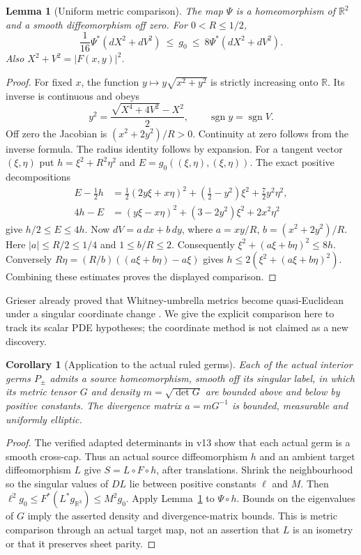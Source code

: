 \documentclass[11pt]{article}
\newtheorem{lemma}[theorem]{Lemma}
\newtheorem{corollary}[theorem]{Corollary}
\theoremstyle{remark}\newtheorem{remark}[theorem]{Remark}
\newcommand{\R}{\mathbb R}\newcommand{\C}{\mathbb C}
\begin{document}
\begin{lemma}[Uniform metric comparison]\label{lem:metric}
The map $\Psi$ is a homeomorphism of $\R^2$ and a smooth diffeomorphism
off zero. For $0<R\leq1/2$,
\[
 \frac1{16}\Psi^*(dX^2+dV^2)\ \leq\ g_0\ \leq\
 8\Psi^*(dX^2+dV^2).
\]
Also $X^2+V^2=|F(x,y)|^2$.
\end{lemma}
\begin{proof}
For fixed $x$, the function $y\mapsto y\sqrt{x^2+y^2}$ is strictly
increasing onto $\R$. Its inverse is continuous and obeys
\[
 y^2=\frac{\sqrt{X^4+4V^2}-X^2}{2},\qquad \operatorname{sgn}y=\operatorname{sgn}V.
\]
Off zero the Jacobian is $(x^2+2y^2)/R>0$. Continuity at zero follows
from the inverse formula. The radius identity follows by expansion.
For a tangent vector $(\xi,\eta)$ put $h=\xi^2+R^2\eta^2$ and
$E=g_0((\xi,\eta),(\xi,\eta))$. The exact positive decompositions
\begin{align*}
 E-\tfrac12h&=\tfrac12(2y\xi+x\eta)^2
       +(\tfrac12-y^2)\xi^2+\tfrac72y^2\eta^2,\\
 4h-E&=(y\xi-x\eta)^2+(3-2y^2)\xi^2+2x^2\eta^2
\end{align*}
give $h/2\leq E\leq4h$.
Now $dV=a\,dx+b\,dy$, where $a=xy/R$, $b=(x^2+2y^2)/R$.
Here $|a|\leq R/2\leq1/4$ and $1\leq b/R\leq2$.
Consequently $\xi^2+(a\xi+b\eta)^2\leq8h$.
Conversely $R\eta=(R/b)((a\xi+b\eta)-a\xi)$ gives
$h\leq2(\xi^2+(a\xi+b\eta)^2)$. Combining these estimates proves
the displayed comparison.
\end{proof}

Grieser already proved that Whitney-umbrella metrics become quasi-Euclidean
under a singular coordinate change \cite[Section 1]{grieser}. We give the
explicit comparison here to track its scalar PDE hypotheses; the coordinate
method is not claimed as a new discovery.

\begin{corollary}[Application to the actual ruled germs]\label{cor:actualmetric}
Each of the actual interior germs $P_\pm$ admits a source homeomorphism,
smooth off its singular label, in which its metric tensor $G$ and density
$m=\sqrt{\det G}$ are bounded above and below by positive constants.
The divergence matrix $a=mG^{-1}$ is bounded, measurable and uniformly elliptic.
\end{corollary}
\begin{proof}
The verified adapted determinants in v13 show that each actual germ is a
smooth cross-cap. Thus an actual source diffeomorphism $h$ and an ambient
target diffeomorphism $L$ give $S=L\circ F\circ h$, after translations.
Shrink the neighbourhood so the singular values of $DL$ lie between positive
constants $\ell$ and $M$. Then $\ell^2g_0\leq F^*(L^*g_{\R^3})\leq M^2g_0$.
Apply Lemma~\ref{lem:metric} to $\Psi\circ h$. Bounds on the eigenvalues of
$G$ imply the asserted density and divergence-matrix bounds. This is
metric comparison through an actual target map, not an assertion that $L$
is an isometry or that it preserves sheet parity.
\end{proof}
\end{document}
